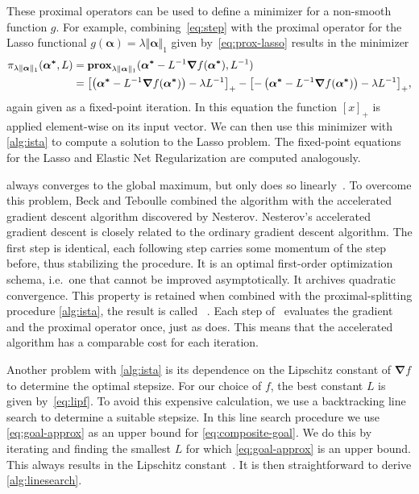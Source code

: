 These proximal operators can be used to define a minimizer for a non-smooth
function \(g\).
For example, combining~\cref{eq:step} with the proximal operator for the
Lasso functional \(g(\bm{\alpha}) = \lambda \Vert \bm{\alpha} \Vert_1\) given by~\cref{eq:prox-lasso} results in
the minimizer
\begin{align*}
  \pi_{\lambda \Vert \bm{\alpha} \Vert_1}(\bm{\alpha^*} ,L)
  &=  \prox[\(\lambda \Vert \bm{\alpha} \Vert_1\)]{\bm{\alpha^*} - L^{-1} \bm{\nabla} f (\bm{\alpha^*})}{L^{-1}} \\
  &= {\left[ \left(\bm{\alpha^*} - L^{-1} \bm{\nabla} f (\bm{\alpha^*}) \right) - \lambda L^{-1} \right]}_+ -
    {\left[ -\left(\bm{\alpha^*} - L^{-1} \bm{\nabla} f (\bm{\alpha^*}) \right) - \lambda L^{-1} \right]}_+,
\end{align*}
again given as a fixed-point iteration.
In this equation the function \( \left[ x \right]_+ \) is applied element-wise on its input vector.
We can then use this minimizer with \cref{alg:ista} to compute a solution to
the Lasso problem.
The fixed-point equations for the Lasso and Elastic Net Regularization are
computed analogously.

\ista always converges to the global maximum, but only does so linearly~\cite{fista}.
To overcome this problem, Beck and Teboulle combined the \ista algorithm with
the accelerated gradient descent algorithm discovered by Nesterov. 
Nesterov's accelerated gradient descent is closely related to the ordinary
gradient descent algorithm.
The first step is identical, each following step carries some momentum of the
step before, thus stabilizing the procedure.
It is an optimal first-order optimization schema, i.e.~one that cannot be
improved asymptotically.
It archives quadratic convergence.
This property is retained when combined with the proximal-splitting procedure \cref{alg:ista}, the result is called \fista~\cite{fista}.
Each step of \fista\ evaluates the gradient and the proximal operator once, just as \ista does.
This means that the accelerated algorithm has a comparable cost for each iteration.

Another problem with \cref{alg:ista} is its dependence on the Lipschitz constant of
\(\bm{\nabla} f\) to determine the optimal stepsize.
For our choice of \(f\), the best constant \(L\) is given by~\cref{eq:lipf}.
To avoid this expensive calculation, we use a backtracking line search to
determine a suitable stepsize.
In this line search procedure we use \cref{eq:goal-approx} as an upper bound for \cref{eq:composite-goal}.
We do this by iterating and finding the smallest \(L\) for which
\cref{eq:goal-approx} is an upper bound.
This always results in the Lipschitz constant~\cite{fista}.
It is then straightforward to derive \cref{alg:linesearch}.

